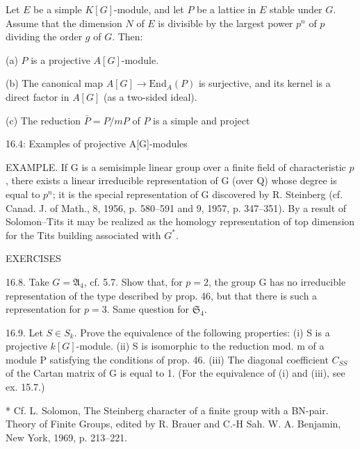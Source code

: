 Let $E$ be a simple $K[G]$-module, and let $P$ be a lattice in $E$ stable under $G$. Assume that the dimension $N$ of $E$ is divisible by the largest power $p^n$ of $p$ dividing the order $g$ of $G$. Then:

(a) $P$ is a projective $A[G]$-module.

(b) The canonical map $A[G] \rightarrow \text{End}_A(P)$ is surjective, and its kernel is a direct factor in $A[G]$ (as a two-sided ideal).

(c) The reduction $\bar{P} = P/mP$ of $P$ is a simple and project

16.4: Examples of projective A[G]-modules

EXAMPLE. If G is a semisimple linear group over a finite field of characteristic $p$, there exists a linear irreducible representation of G (over Q) whose degree is equal to $p^n$; it is the special representation of G discovered by R. Steinberg (cf. Canad. J. of Math., 8, 1956, p. 580–591 and 9, 1957, p. 347–351). By a result of Solomon–Tits it may be realized as the homology representation of top dimension for the Tits building associated with $G^*$.

EXERCISES

16.8. Take $G = \mathfrak{A}_4$, cf. 5.7. Show that, for $p = 2$, the group G has no irreducible representation of the type described by prop. 46, but that there is such a representation for $p = 3$. Same question for $\mathfrak{S}_4$.

16.9. Let $S \in S_k$. Prove the equivalence of the following properties:
(i) S is a projective $k[G]$-module.
(ii) S is isomorphic to the reduction mod. m of a module P satisfying the conditions of prop. 46.
(iii) The diagonal coefficient $C_{SS}$ of the Cartan matrix of G is equal to 1. (For the equivalence of (i) and (iii), see ex. 15.7.)

* Cf. L. Solomon, The Steinberg character of a finite group with a BN-pair. Theory of Finite Groups, edited by R. Brauer and C.-H Sah. W. A. Benjamin, New York, 1969, p. 213–221.

